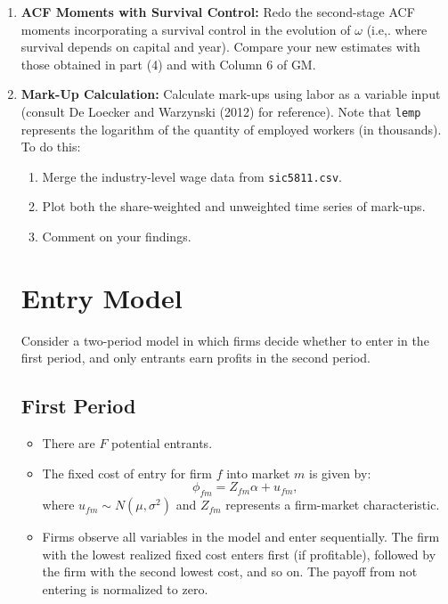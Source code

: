 \documentclass{article}
\begin{document}
\begin{enumerate}
\item \textbf{ACF Moments with Survival Control:}
Redo the second-stage ACF moments incorporating a survival control in the evolution of $\omega$ (i.e,. where survival depends on capital and year). Compare your new estimates with those obtained in part (4) and with Column 6 of GM.



\item \textbf{Mark-Up Calculation:}
Calculate mark-ups using labor as a variable input (consult De Loecker and Warzynski (2012) for reference). Note that \texttt{lemp} represents the logarithm of the quantity
of employed workers (in thousands). To do this:
\begin{enumerate}
\item Merge the industry-level wage data from \texttt{sic5811.csv}.


\item Plot both the share-weighted and unweighted time series of mark-ups. 


\item Comment on your findings. 
\end{enumerate}

\section{Entry Model}

Consider a two-period model in which firms decide whether to enter in the first period, and only entrants earn profits in the second period.

\subsection{First Period}
\begin{itemize}
\item There are $F$ potential entrants.
\item The fixed cost of entry for firm $f$ into market $m$ is given by:
\begin{equation}
\phi_{fm} = Z_{fm} \alpha + u_{fm},
\end{equation}
where $u_{fm} \sim N (\mu, \sigma^2)$ and $Z_{fm}$ represents a firm-market characteristic.
\item Firms observe all variables in the model and enter sequentially. The firm with the lowest realized fixed cost enters first (if profitable), followed by the firm with the second lowest cost, and so on. The payoff from not entering is normalized to zero.
\end{itemize}


\end{enumerate}
\end{document}
